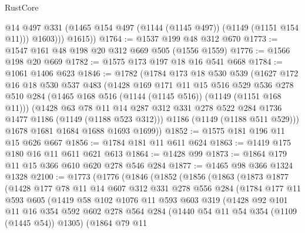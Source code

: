 \begin{lexlean}{RustCore}
\begin{coremodule}
              @14
              @497
              @331
              (@1465 @154 @497 (@1144 (@1145 @497)) (@1149 (@1151 @154 @11)))
              @1603)))
        @1615))
@1764 := @1537 @199 @48 @312 @670
@1773 := @1547 @161 @48 @198 @20 @312 @669 @505 (@1556 @1559)
@1776 := @1566 @198 @20 @669
@1782 := @1575 @173 @197 @18 @16 @541 @668
@1784 := @1061 @1406 @623
@1846 := @1782
    (@1784
      @173
      @18
      @530
      @539
      (@1627
        @172
        @16
        @18
        @530
        @537
        @483
        (@1428
          @169
          @171
          @11
          @15
          @516
          @529
          @536
          @278
          @510
          @284
          (@1465 @168 @516 (@1144 (@1145 @516)) (@1149 (@1151 @168 @11)))
          (@1428
            @63
            @78
            @11
            @14
            @287
            @312
            @331
            @278
            @522
            @284
            @1736
            @1477
            @1186
            (@1149 (@1188 @523 @312)))
          @1186
          (@1149 (@1188 @511 @529)))
        @1678
        @1681
        @1684
        @1688
        @1693
        @1699))
@1852 := @1575 @181 @196 @11 @15 @626 @667
@1856 := @1784 @181 @11 @611 @624
@1863 := @1419 @175 @180 @16 @11 @611 @621 @613
@1864 := @1428 @99
@1873 := @1864 @179 @11 @15 @366 @610 @620 @278 @546 @284
@1877 := @1465 @98 @366 @1324 @1328
@2100 := @1773
    (@1776
      (@1846
        (@1852
          (@1856
            (@1863
              (@1873
                @1877
                (@1428
                  @177
                  @78
                  @11
                  @14
                  @607
                  @312
                  @331
                  @278
                  @556
                  @284
                  (@1784
                    @177
                    @11
                    @593
                    @605
                    (@1419
                      @58
                      @102
                      @1076
                      @11
                      @593
                      @603
                      @319
                      (@1428
                        @92
                        @101
                        @11
                        @16
                        @354
                        @592
                        @602
                        @278
                        @564
                        @284
                        (@1440 @54 @11 @54 @354 (@1109 (@1445 @54)) @1305)
                        (@1864
                          @79
                          @11

\end{coremodule}
\end{lexlean}
